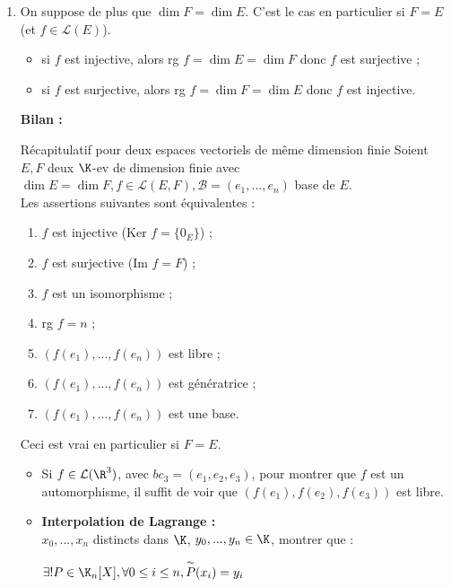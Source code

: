 \documentclass[12pt, a4paper]{report}
\begin{document}
\begin{enumerate}
\begin{itemize}
		\item De façon équivalente, si $f$ est injective alors $\dim E \le \dim F$ ; si $f$ est surjective alors $\dim F \le \dim E$. Et, si $f$ est un isomorphisme, alors $\dim E = \dim F$.
	\end{itemize}
	
	\item On suppose de plus que $\dim F = \dim E$. C'est le cas en particulier si $F = E$ (et $f \in \mathcal{L}(E)$).
	
	\begin{itemize}
		\item si $f$ est injective, alors rg $f = \dim E = \dim F$ donc $f$ est surjective ;
		\item si $f$ est surjective, alors rg $f = \dim F = \dim E$ donc $f$ est injective.
	\end{itemize}
	\textbf{Bilan :} 
	
	\begin{theoreme}{Récapitulatif pour deux espaces vectoriels de même dimension finie}{}
	Soient $E,F$ deux $\K$-ev de dimension finie avec $\dim E = \dim F, f \in \mathcal{L}(E,F), \mathcal{B} = (e_1,...,e_n)$ base de $E$. \\
	Les assertions suivantes sont équivalentes :
	\begin{enumerate}
		\item $f$ est injective ($\text{Ker }f = \{0_E\}$) ;
		\item $f$ est surjective ($\text{Im }f = F$) ;
		\item $f$ est un isomorphisme ;
		\item rg $f = n$ ;
		\item $(f(e_1),...,f(e_n))$ est libre ;
		\item $(f(e_1),...,f(e_n))$ est génératrice ;
		\item $(f(e_1),...,f(e_n))$ est une base.
	\end{enumerate}
	\end{theoreme}

	Ceci est vrai en particulier si $F = E$. \\

	\begin{exemple}{}
	\begin{itemize}
		\item Si $f \in \mathcal{L}(\R^3)$, avec $bc_3 = (e_1,e_2,e_3)$, pour montrer que $f$ est un automorphisme, il suffit de voir que $(f(e_1),f(e_2),f(e_3))$ est libre.
		\item \textbf{Interpolation de Lagrange :} \\
		$x_0,...,x_n$ distincts dans $\K$, $y_0,...,y_n \in \K$, montrer que :
		\begin{center}
		$\exists ! P \in \K_n[X], \forall 0 \le i \le n, \overset{\sim}{P}(x_i) = y_i$
		\end{center}
		

\end{itemize}
\end{exemple}
\end{enumerate}
\end{document}
